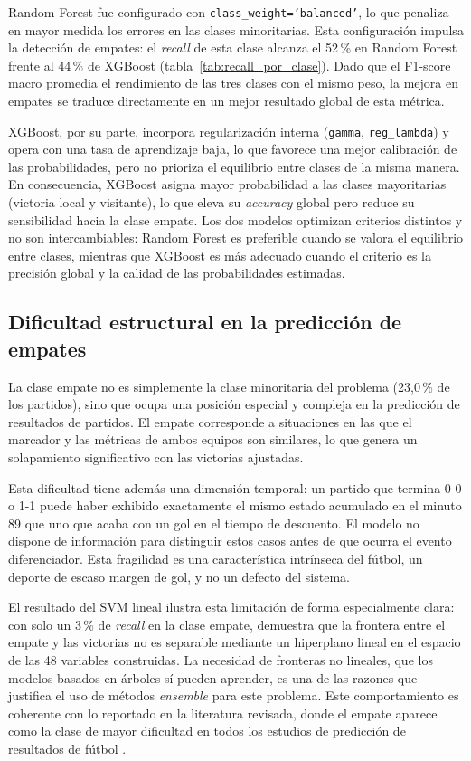 Random Forest fue configurado con \texttt{class\_weight='balanced'}, lo que penaliza en mayor medida los errores en las clases minoritarias. Esta configuración impulsa la detección de empates: el \textit{recall} de esta clase alcanza el 52\,\% en Random Forest frente al 44\,\% de XGBoost (tabla~\ref{tab:recall_por_clase}). Dado que el F1-score macro promedia el rendimiento de las tres clases con el mismo peso, la mejora en empates se traduce directamente en un mejor resultado global de esta métrica.

XGBoost, por su parte, incorpora regularización interna (\texttt{gamma}, \texttt{reg\_lambda}) y opera con una tasa de aprendizaje baja, lo que favorece una mejor calibración de las probabilidades, pero no prioriza el equilibrio entre clases de la misma manera. En consecuencia, XGBoost asigna mayor probabilidad a las clases mayoritarias (victoria local y visitante), lo que eleva su \textit{accuracy} global pero reduce su sensibilidad hacia la clase empate. Los dos modelos optimizan criterios distintos y no son intercambiables: Random Forest es preferible cuando se valora el equilibrio entre clases, mientras que XGBoost es más adecuado cuando el criterio es la precisión global y la calidad de las probabilidades estimadas.

\subsection{Dificultad estructural en la predicción de empates}

La clase empate no es simplemente la clase minoritaria del problema (23,0\,\% de los partidos), sino que ocupa una posición especial y compleja en la predicción de resultados de partidos. El empate corresponde a situaciones en las que el marcador y las métricas de ambos equipos son similares, lo que genera un solapamiento significativo con las victorias ajustadas.

Esta dificultad tiene además una dimensión temporal: un partido que termina 0-0 o 1-1 puede haber exhibido exactamente el mismo estado acumulado en el minuto 89 que uno que acaba con un gol en el tiempo de descuento. El modelo no dispone de información para distinguir estos casos antes de que ocurra el evento diferenciador. Esta fragilidad es una característica intrínseca del fútbol, un deporte de escaso margen de gol, y no un defecto del sistema.

El resultado del SVM lineal ilustra esta limitación de forma especialmente clara: con solo un 3\,\% de \textit{recall} en la clase empate, demuestra que la frontera entre el empate y las victorias no es separable mediante un hiperplano lineal en el espacio de las 48 variables construidas. La necesidad de fronteras no lineales, que los modelos basados en árboles sí pueden aprender, es una de las razones que justifica el uso de métodos \textit{ensemble} para este problema. Este comportamiento es coherente con lo reportado en la literatura revisada, donde el empate aparece como la clase de mayor dificultad en todos los estudios de predicción de resultados de fútbol \citep{baboota2019predictive, horvat2020review}.

